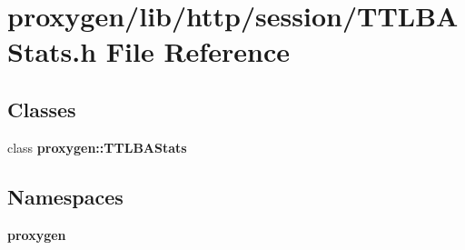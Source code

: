 \section{proxygen/lib/http/session/\+T\+T\+L\+B\+A\+Stats.h File Reference}
\label{TTLBAStats_8h}
\subsection*{Classes}
\begin{DoxyCompactItemize}
\item 
class {\bf proxygen\+::\+T\+T\+L\+B\+A\+Stats}
\end{DoxyCompactItemize}
\subsection*{Namespaces}
\begin{DoxyCompactItemize}
\item 
 {\bf proxygen}
\end{DoxyCompactItemize}
